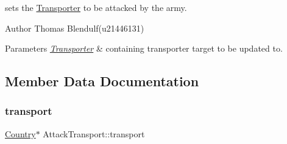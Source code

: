 sets the \mbox{\hyperlink{class_transporter}{Transporter}} to be attacked by the army. 

\begin{DoxyAuthor}{Author}
Thomas Blendulf(u21446131) 
\end{DoxyAuthor}

\begin{DoxyParams}{Parameters}
{\em \mbox{\hyperlink{class_transporter}{Transporter}}} & containing transporter target to be updated to. \\
\hline
\end{DoxyParams}


\subsection{Member Data Documentation}
\mbox{\label{class_attack_transport_a8b480bd76555fcb7c7a54a72db33f742}} 
\subsubsection{\texorpdfstring{transport}{transport}}
{\footnotesize\ttfamily \mbox{\hyperlink{class_country}{Country}}$\ast$ Attack\+Transport\+::transport}

